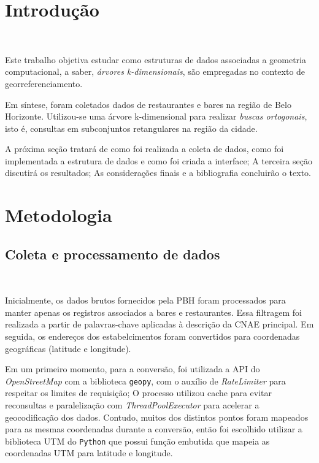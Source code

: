 \documentclass{article}
\begin{document}
\begin{adjustwidth}{-1.5cm}{-1.5cm}

\section{Introdução}
\ 

Este trabalho objetiva estudar como estruturas de dados associadas a geometria computacional, a saber, \textit{árvores k-dimensionais}, são empregadas no contexto de georreferenciamento.

Em síntese, foram coletados dados de restaurantes e bares na região de Belo Horizonte. Utilizou-se uma árvore k-dimensional para realizar \textit{buscas ortogonais}, isto é, consultas em subconjuntos retangulares na região da cidade.

A próxima seção tratará de como foi realizada a coleta de dados, como foi implementada a estrutura de dados e como foi criada a interface; A terceira seção discutirá os resultados; As considerações finais e a bibliografia concluirão o texto.

\section{Metodologia}

\subsection{Coleta e processamento de dados}
\ 

Inicialmente, os dados brutos fornecidos pela PBH foram processados para manter apenas os registros associados a bares e restaurantes. Essa filtragem foi realizada a partir de palavras-chave aplicadas à descrição da CNAE principal. Em seguida, os endereços dos estabelcimentos foram convertidos para coordenadas geográficas (latitude e longitude).

Em um primeiro momento, para a conversão, foi utilizada a API do \textit{OpenStreetMap} com a biblioteca \texttt{geopy}, com o auxílio de \textit{RateLimiter} para respeitar os limites de requisição; O processo utilizou cache para evitar reconsultas e paralelização com \textit{ThreadPoolExecutor} para acelerar a geocodificação dos dados. Contudo, muitos dos distintos pontos foram mapeados para as mesmas coordenadas durante a conversão, então foi escolhido utilizar a biblioteca UTM do \texttt{Python} que possui função embutida que mapeia as coordenadas UTM para latitude e longitude.


\end{adjustwidth}
\end{document}

